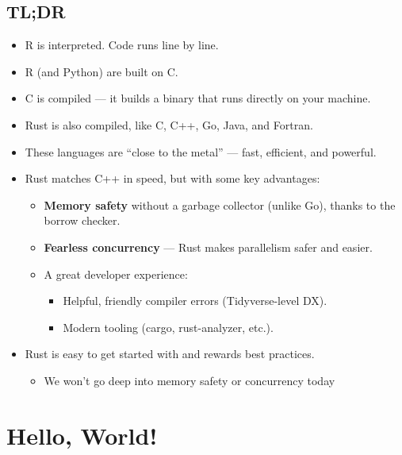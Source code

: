 \documentclass[
  letterpaper,
  DIV=11,
  numbers=noendperiod,
  oneside]{scrreprt}
\providecommand{\tightlist}{%
  \setlength{\itemsep}{0pt}\setlength{\parskip}{0pt}}\usepackage{longtable,booktabs,array}
\begin{document}
\section{TL;DR}\label{tldr}

\begin{itemize}
\tightlist
\item
  R is interpreted. Code runs line by line.
\item
  R (and Python) are built on C.
\item
  C is compiled --- it builds a binary that runs directly on your
  machine.
\item
  Rust is also compiled, like C, C++, Go, Java, and Fortran.
\item
  These languages are ``close to the metal'' --- fast, efficient, and
  powerful.
\item
  Rust matches C++ in speed, but with some key advantages:

  \begin{itemize}
  \tightlist
  \item
    \textbf{Memory safety} without a garbage collector (unlike Go),
    thanks to the borrow checker.
  \item
    \textbf{Fearless concurrency} --- Rust makes parallelism safer and
    easier.
  \item
    A great developer experience:

    \begin{itemize}
    \tightlist
    \item
      Helpful, friendly compiler errors (Tidyverse-level DX).
    \item
      Modern tooling (cargo, rust-analyzer, etc.).
    \end{itemize}
  \end{itemize}
\item
  Rust is easy to get started with and rewards best practices.

  \begin{itemize}
  \tightlist
  \item
    We won't go deep into memory safety or concurrency today
  \end{itemize}
\end{itemize}

\chapter{Hello, World!}\label{hello-world}
\end{document}
